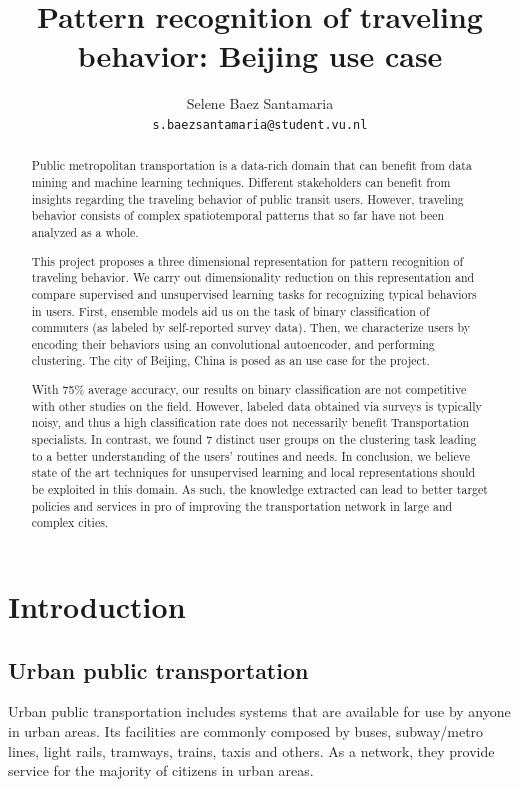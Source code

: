 \documentclass{article}
\title{Pattern recognition of traveling behavior: Beijing use case}
\author{
  Selene Baez  Santamaria \\
  \texttt{s.baezsantamaria@student.vu.nl}
}
\begin{document}

\maketitle

\begin{abstract}
  Public metropolitan transportation is a data-rich domain that can benefit from data mining and machine learning techniques. Different stakeholders can benefit from insights regarding the traveling behavior of public transit users. However, traveling behavior consists of complex  spatiotemporal patterns that so far have not been analyzed as a whole.
  
  This project proposes a three dimensional representation for pattern recognition of traveling behavior. We carry out dimensionality reduction on this representation and compare supervised and unsupervised learning tasks for recognizing typical behaviors in users. First, ensemble models aid us on the task of binary classification of commuters (as labeled by self-reported survey data). Then, we characterize users by encoding their behaviors using an convolutional autoencoder, and performing clustering. The city of Beijing, China is posed as an use case for the project. 
  
  With 75\% average accuracy, our results on binary classification are not competitive with other studies on the field. However, labeled data obtained via surveys is typically noisy, and thus a high classification rate does not necessarily benefit Transportation specialists. In contrast, we found 7 distinct user groups on the clustering task leading to a better understanding of the users' routines and needs. In conclusion, we believe state of the art techniques for  unsupervised learning and local representations should be exploited in this domain. As such, the knowledge extracted can lead to better target policies and services in pro of improving the transportation network in large and complex cities.    
  
\end{abstract}

\newpage

\tableofcontents

\newpage
\section{Introduction}

\subsection{Urban public transportation}
Urban public transportation includes systems that are available for use by anyone in urban areas. Its facilities are commonly composed by buses, subway/metro lines, light rails, tramways, trains, taxis and others. As a network, they provide service for the majority of citizens in urban areas.\citep{vuchic1900urban}
\end{document}
